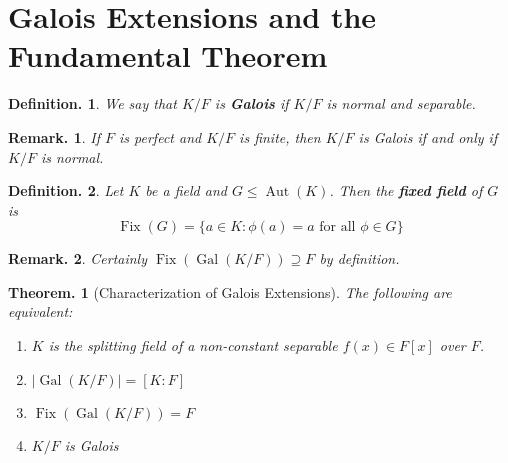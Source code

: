 \documentclass[11pt, a4paper]{memoir}
\newcommand{\mbf}[1]{{\boldmath\bfseries #1}}
\theoremstyle{change}
\newtheorem{theorem}{Theorem.}[section]
\theoremstyle{plain}
\theoremstyle{nonumberplain}
\newtheorem{definition}{Definition.}
\newtheorem{remark}{Remark.}
\DeclareMathOperator{\Aut}{Aut}
\DeclareMathOperator{\Fix}{Fix}
\DeclareMathOperator{\Gal}{Gal}
\numberwithin{equation}{section}
\begin{document}
\section{Galois Extensions and the Fundamental Theorem}
\begin{definition}
    We say that $K/F$ is \mbf{Galois} if $K/F$ is normal and separable.
\end{definition}
\begin{remark}
    If $F$ is perfect and $K/F$ is finite, then $K/F$ is Galois if and only if $K/F$ is normal.
\end{remark}
\begin{definition}
    Let $K$ be a field and $G\leq\Aut(K)$.
    Then the \mbf{fixed field} of $G$ is
    \begin{equation*}
        \Fix(G)=\bigl\{a\in K:\phi(a)=a\text{ for all }\phi\in G\bigr\}
    \end{equation*}
\end{definition}
\begin{remark}
    Certainly $\Fix(\Gal(K/F))\supseteq F$ by definition.
\end{remark}
\begin{theorem}[Characterization of Galois Extensions]
    The following are equivalent:
    \begin{enumerate}[nl]
        \item $K$ is the splitting field of a non-constant separable $f(x)\in F[x]$ over $F$.
        \item $|\Gal(K/F)|=[K:F]$
        \item $\Fix(\Gal(K/F))=F$
        \item $K/F$ is Galois
    \end{enumerate}
\end{theorem}
\end{document}
